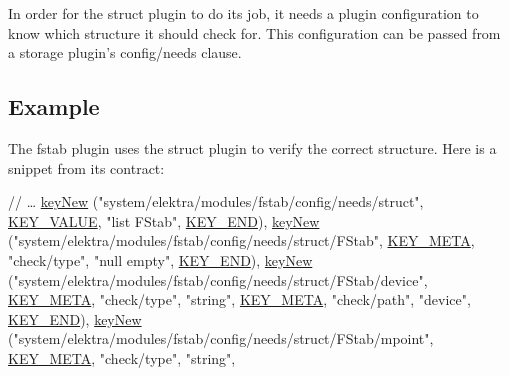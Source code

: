 In order for the {\ttfamily struct} plugin to do its job, it needs a plugin configuration to know which structure it should check for. This configuration can be passed from a storage plugin’s {\ttfamily config/needs} clause.

\subsection*{Example}

The {\ttfamily fstab} plugin uses the {\ttfamily struct} plugin to verify the correct structure. Here is a snippet from it\textquotesingle{}s contract\+:


\begin{DoxyCode}
\textcolor{comment}{// …}
\hyperlink{group__key_gad23c65b44bf48d773759e1f9a4d43b89}{keyNew} (\textcolor{stringliteral}{"system/elektra/modules/fstab/config/needs/struct"},
    \hyperlink{group__key_gga91fb3178848bd682000958089abbaf40ac66e4a49d09212b79f5754ca6db5bd2e}{KEY\_VALUE}, \textcolor{stringliteral}{"list FStab"},
    \hyperlink{group__key_gga91fb3178848bd682000958089abbaf40aa8adb6fcb92dec58fb19410eacfdd403}{KEY\_END}),
\hyperlink{group__key_gad23c65b44bf48d773759e1f9a4d43b89}{keyNew} (\textcolor{stringliteral}{"system/elektra/modules/fstab/config/needs/struct/FStab"},
    \hyperlink{group__key_gga91fb3178848bd682000958089abbaf40a040582834bb2d90049947d7ef74e87e2}{KEY\_META}, \textcolor{stringliteral}{"check/type"}, \textcolor{stringliteral}{"null empty"},
    \hyperlink{group__key_gga91fb3178848bd682000958089abbaf40aa8adb6fcb92dec58fb19410eacfdd403}{KEY\_END}),
\hyperlink{group__key_gad23c65b44bf48d773759e1f9a4d43b89}{keyNew} (\textcolor{stringliteral}{"system/elektra/modules/fstab/config/needs/struct/FStab/device"},
    \hyperlink{group__key_gga91fb3178848bd682000958089abbaf40a040582834bb2d90049947d7ef74e87e2}{KEY\_META}, \textcolor{stringliteral}{"check/type"}, \textcolor{stringliteral}{"string"},
    \hyperlink{group__key_gga91fb3178848bd682000958089abbaf40a040582834bb2d90049947d7ef74e87e2}{KEY\_META}, \textcolor{stringliteral}{"check/path"}, \textcolor{stringliteral}{"device"},
    \hyperlink{group__key_gga91fb3178848bd682000958089abbaf40aa8adb6fcb92dec58fb19410eacfdd403}{KEY\_END}),
\hyperlink{group__key_gad23c65b44bf48d773759e1f9a4d43b89}{keyNew} (\textcolor{stringliteral}{"system/elektra/modules/fstab/config/needs/struct/FStab/mpoint"},
    \hyperlink{group__key_gga91fb3178848bd682000958089abbaf40a040582834bb2d90049947d7ef74e87e2}{KEY\_META}, \textcolor{stringliteral}{"check/type"}, \textcolor{stringliteral}{"string"},

\end{DoxyCode}

